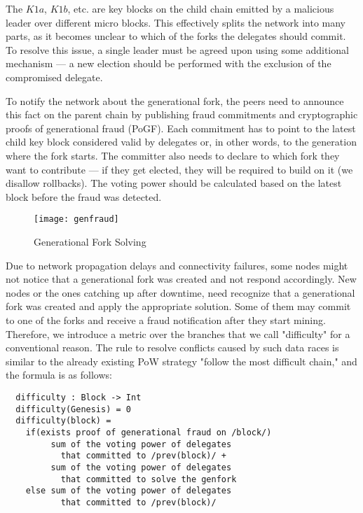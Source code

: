 The $K1a$, $K1b$, etc. are key blocks on the child chain emitted by a malicious
leader over different micro blocks. This
effectively splits the network into many parts, as it becomes unclear to which of
the forks the delegates should commit. To resolve this issue, a single leader
must be agreed upon using some additional mechanism — a new election
should be performed with the exclusion of the compromised delegate.

To notify the network about the generational fork, the peers need to announce
this fact on the parent chain by publishing fraud commitments and
cryptographic proofs of generational fraud (PoGF). Each commitment has to point to
the latest child key block considered valid by delegates or,
 in other words, to the generation where the fork starts. The committer also needs
to declare to which fork they want to contribute — if they get elected, they
will be required to build on it (we disallow rollbacks). The voting power should be
calculated based on the latest block before the fraud was detected.


\begin{figure}[h]
	\caption{Generational Fork Solving}
	\centering
	\texttt{[image: genfraud]}
\end{figure}

Due to network propagation
delays and connectivity failures, some nodes might not notice that a generational
fork was created and not respond accordingly. New nodes or the ones catching up
after downtime, need recognize that a generational fork was created and apply
the appropriate solution. Some of them may commit to one of the forks and receive a fraud
notification after they start mining. Therefore, we introduce a metric over the
branches that we call "difficulty" for a conventional reason. The
rule to resolve conflicts caused by such data races is similar to the already
existing PoW strategy "follow the most difficult chain," and the formula is
as follows:

\begin{minipage}{\linewidth}
\begin{lstlisting}
  difficulty : Block -> Int
  difficulty(Genesis) = 0
  difficulty(block) =
    if(exists proof of generational fraud on /block/)
         sum of the voting power of delegates
           that committed to /prev(block)/ +
         sum of the voting power of delegates
           that committed to solve the genfork
    else sum of the voting power of delegates
           that committed to /prev(block)/
\end{lstlisting}
\end{minipage}

